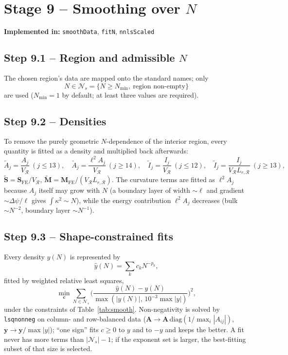 \documentclass[11pt,a4paper]{article}
\newcommand{\Nset}{\mathcal{N}}
\newcommand{\code}[1]{\texttt{#1}}
\theoremstyle{plain}
\theoremstyle{remark}
\newcommand{\implementedin}[1]{\begin{codebox}\textbf{Implemented in:} #1\end{codebox}}
\begin{document}
\section{Stage 9 -- Smoothing over $N$}
\label{sec:stage9}
\implementedin{\code{smoothData}, \code{fitN}, \code{nnlsScaled}}

\subsection*{Step 9.1 -- Region and admissible $N$}
The chosen region's data are mapped onto the standard names; only
\[
  N\in\Nset_s=\{N\ge N_{\min},\ \text{region non-empty}\}
\]
are used ($N_{\min}=1$ by default; at least three values are required).

\subsection*{Step 9.2 -- Densities}
To remove the purely geometric $N$-dependence of the interior region, every quantity is fitted as a
density and multiplied back afterwards:
\begin{equation}
  \tilde A_j=\frac{A_j}{V_{\mathcal R}}\ (j\le13),\quad
  \tilde A_j=\frac{\ell^2A_j}{V_{\mathcal R}}\ (j\ge14),\quad
  \tilde I_j=\frac{I_j}{V_{\mathcal R}}\ (j\le12),\quad
  \tilde I_j=\frac{I_j}{V_{\mathcal R}L_{r,\mathcal R}}\ (j\ge13),
\end{equation}
$\tilde{\bm S}=\bm S_{\mathrm{FE}}/V_{\mathcal R}$, $\tilde{\bm M}=\bm M_{\mathrm{FE}}/(V_{\mathcal R}L_{r,\mathcal R})$.
The curvature terms are fitted as $\ell^2A_j$ because $A_j$ itself may grow with $N$ (a boundary
layer of width $\sim\ell$ and gradient $\sim\Delta\psi/\ell$ gives $\int\kappa^2\sim N$), while the
energy contribution $\ell^2A_j$ decreases (bulk $\sim N^{-2}$, boundary layer $\sim N^{-1}$).

\subsection*{Step 9.3 -- Shape-constrained fits}
Every density $y(N)$ is represented by
\begin{equation}
  \hat y(N)=\sum_kc_kN^{-p_k},
  \label{eq:fit}
\end{equation}
fitted by weighted relative least squares,
\begin{equation}
  \min_{\bm c}\sum_{N\in\Nset_s}\Big(\frac{\hat y(N)-y(N)}{\max(|y(N)|,\,10^{-3}\max|y|)}\Big)^2,
  \label{eq:wls}
\end{equation}
under the constraints of Table~\ref{tab:smooth}. Non-negativity is solved by \code{lsqnonneg} on
column- and row-balanced data ($\bm A\to\bm A\,\mathrm{diag}(1/\max_i|A_{ij}|)$,
$\bm y\to\bm y/\max|y|$); ``one sign'' fits $c\ge0$ to $y$ and to $-y$ and keeps the better. A fit
never has more terms than $|\Nset_s|-1$; if the exponent set is larger, the best-fitting subset of
that size is selected.
\end{document}
